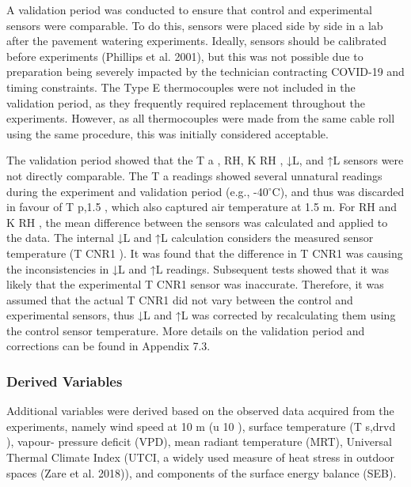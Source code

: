\documentclass[final,3p,times,authoryear]{elsarticle}
\begin{document}
A validation period was conducted to ensure that control and experimental sensors were
comparable. To do this, sensors were placed side by side in a lab after the pavement
watering experiments. Ideally, sensors should be calibrated before experiments (Phillips
et al. 2001), but this was not possible due to preparation being severely impacted by the
technician contracting COVID-19 and timing constraints. The Type E thermocouples
were not included in the validation period, as they frequently required replacement
throughout the experiments. However, as all thermocouples were made from the same
cable roll using the same procedure, this was initially considered acceptable.

The validation period showed that the T a , RH, K RH , ↓L, and ↑L sensors were not directly
comparable. The T a readings showed several unnatural readings during the experiment
and validation period (e.g., -40$^{\circ}$C), and thus was discarded in favour of T p,1.5 , which
also captured air temperature at 1.5 m. For RH and K RH , the mean difference between
the sensors was calculated and applied to the data.
The internal ↓L and ↑L calculation considers the measured sensor temperature (T CNR1 ). It
was found that the difference in T CNR1 was causing the inconsistencies in ↓L and ↑L
readings. Subsequent tests showed that it was likely that the experimental T CNR1 sensor
was inaccurate. Therefore, it was assumed that the actual T CNR1 did not vary between the
control and experimental sensors, thus ↓L and ↑L was corrected by recalculating them
using the control sensor temperature. More details on the validation period and
corrections can be found in Appendix 7.3.

\subsubsection{Derived Variables}\label{sec:methods2.2.2}

Additional variables were derived based on the observed data acquired from the
experiments, namely wind speed at 10 m (u 10 ), surface temperature (T s,drvd ), vapour-
pressure deficit (VPD), mean radiant temperature (MRT), Universal Thermal Climate
Index (UTCI, a widely used measure of heat stress in outdoor spaces (Zare et al. 2018)),
and components of the surface energy balance (SEB).
\end{document}
